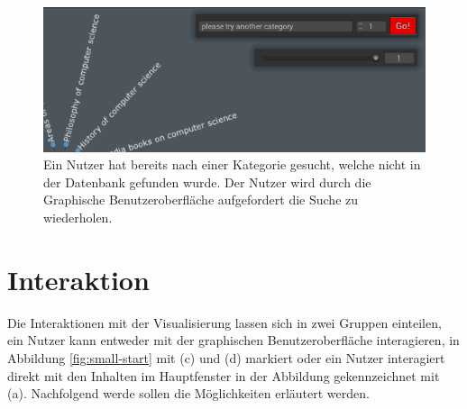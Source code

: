 \begin{figure}
    \centering
    \includegraphics[scale=.5]{images/small-start-wrong-cat-1.png}
    \caption{Ein Nutzer hat bereits nach einer Kategorie gesucht, welche nicht in der Datenbank gefunden wurde. Der Nutzer wird durch die Graphische Benutzeroberfläche aufgefordert die Suche zu wiederholen.}
    \label{fig:wrong-cat}
\end{figure}

\section{Interaktion}
Die Interaktionen mit der Visualisierung lassen sich in zwei Gruppen einteilen, ein Nutzer kann entweder mit der graphischen Benutzeroberfläche interagieren, in Abbildung \ref{fig:small-start} mit (c) und (d) markiert oder ein Nutzer interagiert direkt mit den Inhalten im Hauptfenster in der Abbildung gekennzeichnet mit (a).
Nachfolgend werde sollen die Möglichkeiten erläutert werden.

